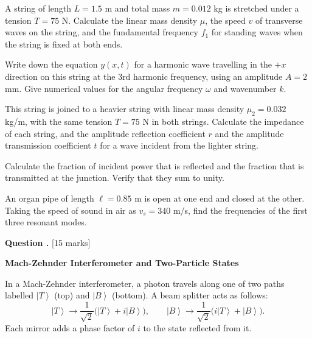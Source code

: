 \documentclass[12pt,a4paper]{article}
\newcounter{questioncounter}
\newcommand{\question}[1]{%
  \stepcounter{questioncounter}%
  \vspace{0.5cm}%
  \noindent\textbf{Question \thequestioncounter.} \hfill [#1 marks]%
  \vspace{0.2cm}%
  \par%
}
\renewcommand{\ket}[1]{\left|#1\right\rangle}
\begin{document}
\begin{parts}
\item A string of length $L = 1.5$ m and total mass $m = 0.012$ kg is stretched under a tension $T = 75$ N. Calculate the linear mass density $\mu$, the speed $v$ of transverse waves on the string, and the fundamental frequency $f_1$ for standing waves when the string is fixed at both ends. 

\item Write down the equation $y(x,t)$ for a harmonic wave travelling in the $+x$ direction on this string at the 3rd harmonic frequency, using an amplitude $A = 2$ mm. Give numerical values for the angular frequency $\omega$ and wavenumber $k$. 

\item This string is joined to a heavier string with linear mass density $\mu_2 = 0.032$ kg/m, with the same tension $T = 75$ N in both strings. Calculate the impedance of each string, and the amplitude reflection coefficient $r$ and the amplitude transmission coefficient $t$ for a wave incident from the lighter string. 

\item Calculate the fraction of incident power that is reflected and the fraction that is transmitted at the junction. Verify that they sum to unity. 

\item An organ pipe of length $\ell = 0.85$ m is open at one end and closed at the other. Taking the speed of sound in air as $v_s = 340$ m/s, find the frequencies of the first three resonant modes. 
\end{parts}

\newpage

\question{15}

\noindent\textbf{Mach-Zehnder Interferometer and Two-Particle States}

\noindent In a Mach-Zehnder interferometer, a photon travels along one of two paths labelled $\ket{T}$ (top) and $\ket{B}$ (bottom). A beam splitter acts as follows:
\[
\ket{T} \to \frac{1}{\sqrt{2}}\bigl(\ket{T} + i\ket{B}\bigr), \qquad
\ket{B} \to \frac{1}{\sqrt{2}}\bigl(i\ket{T} + \ket{B}\bigr).
\]
Each mirror adds a phase factor of $i$ to the state reflected from it.
\end{document}
